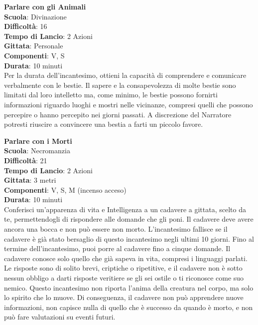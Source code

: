 \begin{multicols}{2}
\medskip\textbf{Parlare con gli Animali}\\
\textbf{Scuola}: Divinazione\\
\textbf{Difficoltà}: 16\\
\textbf{Tempo di Lancio}: 2 Azioni\\
\textbf{Gittata}: Personale\\
\textbf{Componenti}: V, S\\
\textbf{Durata}: 10 minuti\\
Per la durata dell'incantesimo, ottieni la capacità di comprendere e comunicare verbalmente con le bestie. Il sapere e la consapevolezza di molte bestie sono limitati dal loro intelletto ma, come minimo, le bestie possono fornirti informazioni riguardo luoghi e mostri nelle vicinanze, compresi quelli che possono percepire o hanno percepito nei giorni passati. A discrezione del Narratore potresti riuscire a convincere una bestia a farti un piccolo favore.

\medskip\textbf{Parlare con i Morti}\\
\textbf{Scuola}: Necromanzia\\
\textbf{Difficoltà}: 21\\
\textbf{Tempo di Lancio}: 2 Azioni\\
\textbf{Gittata}: 3 metri\\
\textbf{Componenti}: V, S, M (incenso acceso)\\
\textbf{Durata}: 10 minuti\\
Conferisci un'apparenza di vita e Intelligenza a un cadavere a gittata, scelto da te, permettendogli di rispondere alle domande che gli poni. Il cadavere deve avere ancora una bocca e non può essere non morto. L'incantesimo fallisce se il cadavere è già stato bersaglio di questo incantesimo negli ultimi 10 giorni. Fino al termine dell'incantesimo, puoi porre al cadavere fino a cinque domande. Il cadavere conosce solo quello che già sapeva in vita, compresi i linguaggi parlati. Le risposte sono di solito brevi, criptiche o ripetitive, e il cadavere non è sotto nessun obbligo a darti risposte veritiere se gli sei ostile o ti riconosce come suo nemico. Questo incantesimo non riporta l'anima della creatura nel corpo, ma solo lo spirito che lo muove. Di conseguenza, il cadavere non può apprendere nuove informazioni, non capisce nulla di quello che è successo da quando è morto, e non può fare valutazioni su eventi futuri.


\end{multicols}
